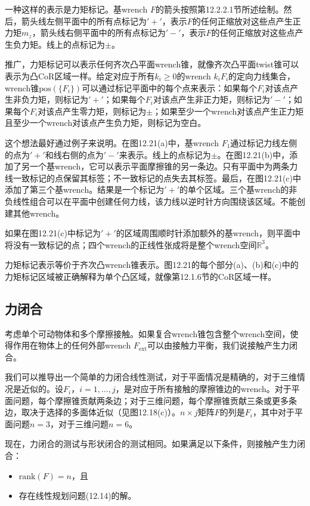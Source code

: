 \documentclass[12pt,a4paper]{article}
\begin{document}
一种这样的表示是力矩标记。基wrench $F$的箭头按照第12.2.2.1节所述绘制。然后，箭头线左侧平面中的所有点标记为$'+'$，表示$F$的任何正缩放对这些点产生正力矩$m_z$，箭头线右侧平面中的所有点标记为$'-'$，表示$F$的任何正缩放对这些点产生负力矩。线上的点标记为$\pm$。

推广，力矩标记可以表示任何齐次凸平面wrench锥，就像齐次凸平面twist锥可以表示为凸CoR区域一样。给定对应于所有$k_i \geq 0$的wrench $k_i F_i$的定向力线集合，wrench锥$\text{pos}(\{F_i\})$可以通过标记平面中的每个点来表示：如果每个$F_i$对该点产生非负力矩，则标记为$'+'$；如果每个$F_i$对该点产生非正力矩，则标记为$'-'$；如果每个$F_i$对该点产生零力矩，则标记为$\pm$；如果至少一个wrench对该点产生正力矩且至少一个wrench对该点产生负力矩，则标记为空白。

这个想法最好通过例子来说明。在图12.21(a)中，基wrench $F_1$通过标记力线左侧的点为$'+'$和线右侧的点为$'-'$来表示。线上的点标记为$\pm$。在图12.21(b)中，添加了另一个基wrench，它可以表示平面摩擦锥的另一条边。只有平面中为两条力线一致标记的点保留其标签；不一致标记的点失去其标签。最后，在图12.21(c)中添加了第三个基wrench。结果是一个标记为$'+'$的单个区域。三个基wrench的非负线性组合可以在平面中创建任何力线，该力线以逆时针方向围绕该区域。不能创建其他wrench。

如果在图12.21(c)中标记为$'+'$的区域周围顺时针添加额外的基wrench，则平面中将没有一致标记的点；四个wrench的正线性张成将是整个wrench空间$\mathbb{R}^3$。

力矩标记表示等价于齐次凸wrench锥表示。图12.21的每个部分(a)、(b)和(c)中的力矩标记区域被正确解释为单个凸区域，就像第12.1.6节的CoR区域一样。

\subsection{力闭合}
\label{subsec:force_closure}

考虑单个可动物体和多个摩擦接触。如果复合wrench锥包含整个wrench空间，使得作用在物体上的任何外部wrench $F_{\text{ext}}$可以由接触力平衡，我们说接触产生力闭合。

我们可以推导出一个简单的力闭合线性测试，对于平面情况是精确的，对于三维情况是近似的。设$F_i$，$i = 1, \ldots, j$，是对应于所有接触的摩擦锥边的wrench。对于平面问题，每个摩擦锥贡献两条边；对于三维问题，每个摩擦锥贡献三条或更多条边，取决于选择的多面体近似（见图12.18(c)）。$n \times j$矩阵$F$的列是$F_i$，其中对于平面问题$n = 3$，对于三维问题$n = 6$。

现在，力闭合的测试与形状闭合的测试相同。如果满足以下条件，则接触产生力闭合：
\begin{itemize}
\item $\text{rank}(F) = n$，且
\item 存在线性规划问题(12.14)的解。
\end{itemize}
\end{document}
